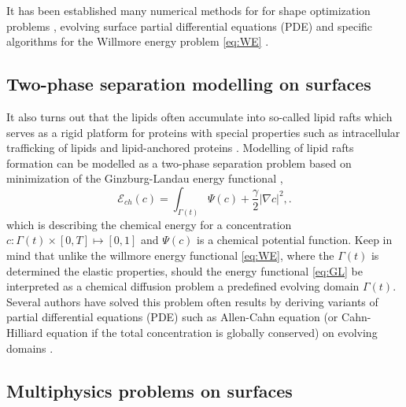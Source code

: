 It has been established many numerical methods for for shape optimization problems \cite{sokolowski1992introduction,ito2008variational}, evolving surface partial differential equations (PDE) \cite{dziuk2013finite, dziuk2007finite,
binz2022convergent, barrett2007parametric, barrett2007variational, kovacs2019convergent, lehrenfeld2018stabilized} and specific
algorithms for the Willmore energy problem \eqref{eq:WE} \cite{palmurella2022parametric, dziuk2008computational, bonito2010parametric,  kovacs2021convergent, hu2022evolving}.

\subsection{Two-phase separation modelling on surfaces }%
\label{sub:two_phase_seperation_modelling_on_surfaces_}

It also turns out that the lipids often accumulate into so-called lipid rafts which serves as a rigid platform for proteins with special properties such as intracellular trafficking of lipids and lipid-anchored proteins \cite{Edidin03, miller2020divide}. Modelling of
lipid rafts formation can be modelled as a two-phase separation problem based on minimization of the Ginzburg-Landau energy functional \cite{yushutin19},
\begin{equation}
\label{eq:GL}
\mathcal{E}_{ch}  \left( c   \right) = \int_{\Gamma\left(t  \right)   }^{}\Psi \left( c \right) + \frac{\gamma}{2} \left\lvert \nabla c \right\rvert^{2} ,
.\end{equation}
which is describing the chemical energy for a concentration $c: \Gamma\left( t \right)  \times \left[ 0,T \right] \mapsto  \left[ 0,1 \right]  $ and $ \Psi \left( c \right)$ is a chemical potential function. Keep in mind that unlike
the willmore energy functional \eqref{eq:WE}, where the $\Gamma\left( t \right)  $ is determined the elastic properties, should the energy functional \eqref{eq:GL} be interpreted as a chemical diffusion problem a predefined evolving domain $\Gamma \left( t \right) $.
Several authors have solved this problem often results by deriving variants of partial differential equations (PDE) such as Allen-Cahn equation (or Cahn-Hilliard equation if the total concentration is globally conserved) on evolving
domains \cite{yushutin19, udo97, ratz16,Gera2017, caetano21}.

\subsection{Multiphysics problems on surfaces}%

